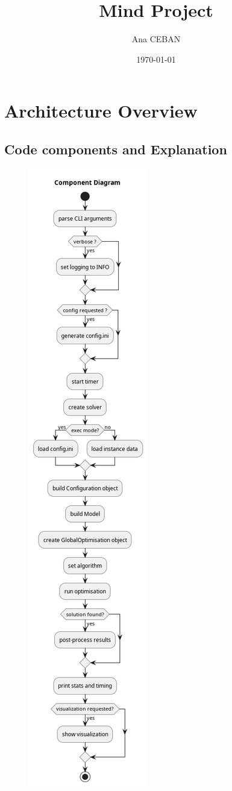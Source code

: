 \documentclass[12pt]{article}
\title{Mind Project}
\author{Ana CEBAN}
\date{\today}
\theoremstyle{definition}
\theoremstyle{definition}
\theoremstyle{remark}
\theoremstyle{remark}
\theoremstyle{definition}
\theoremstyle{remark}
\begin{document}
\maketitle
\tableofcontents
\newpage
{}

\section{Architecture Overview} 
\subsection{Code components and Explanation}

\begin{figure}[H]
    \begin{minipage}{0.25\textwidth}
        \includegraphics[scale=0.4]{"diag.png"}

\end{minipage}
\end{figure}
\end{document}
